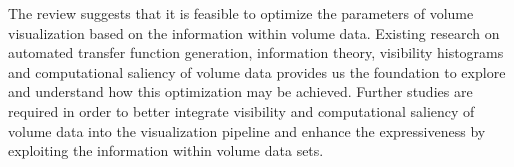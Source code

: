 The review suggests that it is feasible to optimize the parameters of volume visualization based on the information within volume data. Existing research on automated transfer function generation, information theory, visibility histograms and computational saliency of volume data provides us the foundation to explore and understand how this optimization may be achieved.
Further studies are required in order to better integrate visibility and computational saliency of volume data into the visualization pipeline and enhance the expressiveness by exploiting the information within volume data sets.

